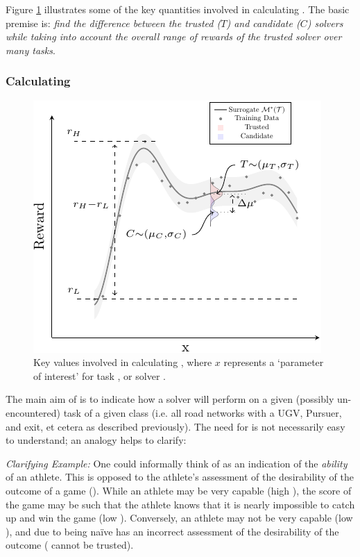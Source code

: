 Figure \ref{fig:sq_v2} illustrates some of the key quantities involved in calculating \xQ. The basic premise is: \emph{find the difference between the trusted ($T$) and candidate ($C$) solvers while taking into account the overall range of rewards of the trusted solver over many tasks}.

\subsubsection{Calculating \texorpdfstring{\xQ}{xQ}}
   \begin{figure}[tb]
        \centering
        \includegraphics[width=0.9\linewidth]{Figures/sq_v2_fig-crop}
        \caption{Key values involved in calculating \xQ, where $x$ represents a `parameter of interest' for task \task, or solver \solve.}
        \label{fig:sq_v2}
        \vspace{-0.2cm}
    \end{figure}
The main aim of \xQ{} is to indicate how a solver \solve{} will perform on a given (possibly un-encountered) task \task{} of a given class \taskclass{} (i.e. all road networks with a UGV, Pursuer, and exit, et cetera as described previously). The need for \xQ{} is not necessarily easy to understand; an analogy helps to clarify:

\emph{Clarifying Example:} One could informally think of \xQ{} as an indication of the \emph{ability} of an athlete. This is opposed to the athlete's assessment of the desirability of the outcome of a game (\xO). While an athlete may be very capable (high \xQ), the score of the game may be such that the athlete knows that it is nearly impossible to catch up and win the game (low \xO). Conversely, an athlete may not be very capable (low \xQ), and due to being na\"{i}ve has an incorrect assessment of the desirability of the outcome (\xO{} cannot be trusted).

